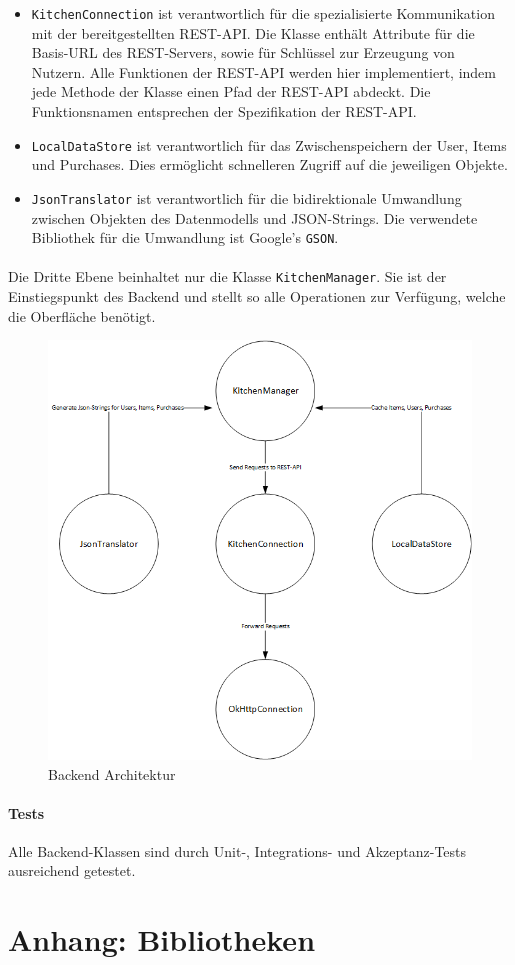 \documentclass{scrartcl}
\begin{document}
			\begin{itemize}
				\item  \texttt{KitchenConnection} ist verantwortlich für die spezialisierte Kommunikation mit der bereitgestellten REST-API. Die Klasse enthält Attribute für die Basis-URL des REST-Servers, sowie für Schlüssel zur Erzeugung von Nutzern. Alle Funktionen der REST-API werden hier implementiert, indem jede Methode der Klasse einen Pfad der REST-API abdeckt. Die Funktionsnamen entsprechen der Spezifikation der REST-API.
				
				\item \texttt{LocalDataStore} ist verantwortlich für das Zwischenspeichern der User, Items und Purchases. Dies ermöglicht schnelleren Zugriff auf die jeweiligen Objekte.
				
				\item \texttt{JsonTranslator} ist verantwortlich für die bidirektionale Umwandlung zwischen Objekten des Datenmodells und JSON-Strings. Die verwendete Bibliothek für die Umwandlung ist Google's \texttt{GSON}.
			\end{itemize}
		
			\paragraph*{}
			Die Dritte Ebene beinhaltet nur die Klasse \texttt{KitchenManager}. Sie ist der Einstiegspunkt des Backend und stellt so alle Operationen zur Verfügung, welche die Oberfläche benötigt.
		
			\begin{figure}[!h]
				\centering
				\label{backendArchitecture}
				\includegraphics[scale=0.5]{./figures/classStructure.png}
				\caption{Backend Architektur}
			\end{figure}

			\paragraph*{Tests}
			Alle Backend-Klassen sind durch Unit-, Integrations- und Akzeptanz-Tests ausreichend getestet.
	
	\section{Anhang: Bibliotheken} \label{bib}
		
\end{document}
